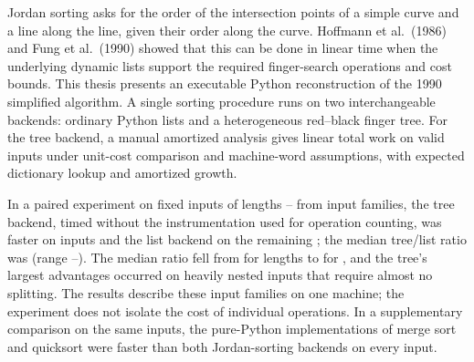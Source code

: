 \label{chap:abstract}

Jordan sorting asks for the order of the intersection points of a simple
curve and a line along the line, given their order along the curve.
Hoffmann et al.\ (1986) and Fung et al.\ (1990) showed that this can be done
in linear time when the underlying dynamic lists support the required
finger-search operations and cost bounds. This thesis presents an executable
Python reconstruction of the 1990 simplified algorithm. A single sorting
procedure runs on two interchangeable backends: ordinary Python lists and a
heterogeneous red--black finger tree. For the tree backend, a manual amortized
analysis gives linear total work on valid inputs under unit-cost comparison
and machine-word assumptions, with expected dictionary lookup and amortized
growth.

In a paired experiment on \UnifiedN{} fixed inputs of lengths
\UnifiedMinN{}--\UnifiedMaxN{} from \UnifiedFamilyCount{} input families,
the tree backend, timed without the instrumentation used for operation
counting, was faster on \UnifiedWins{} inputs and the list backend on the
remaining \UnifiedListWins{}; the median tree/list ratio was \UnifiedMedian{}
(range \UnifiedMinimum{}--\UnifiedMaximum{}). The median ratio fell from
\UnifiedSmallBandMedian{} for lengths \UnifiedSmallBand{} to
\UnifiedLargeBandMedian{} for \UnifiedLargeBand{}, and the tree's largest
advantages occurred on heavily nested inputs that require almost no
splitting. The results describe these input families on one machine;
the experiment does not isolate the cost of individual operations.
In a supplementary comparison on the same inputs, the pure-Python
implementations of merge sort and quicksort were faster than both
Jordan-sorting backends on every input.
